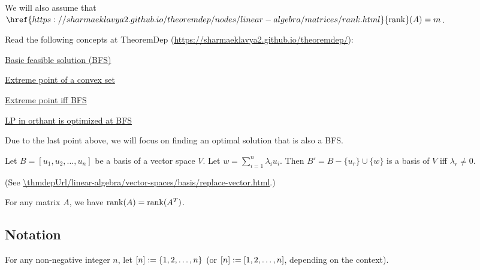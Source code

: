 We will also assume \wLoG{} that
$\href{https://sharmaeklavya2.github.io/theoremdep/nodes/linear-algebra/matrices/rank.html}{\rank}(A) = m$.

\begin{inLongVersion}
Read the following concepts at TheoremDep (\url{https://sharmaeklavya2.github.io/theoremdep/}):
\begin{tightemize}
\item \href{\thmdepUrl/convexity/polyhedra/bfs.html}{Basic feasible solution (BFS)}
\item \href{\thmdepUrl/convexity/extreme-point.html}{Extreme point of a convex set}
\item \href{\thmdepUrl/convexity/polyhedra/extreme-point-iff-bfs.html}{Extreme point iff BFS}
\item \href{\thmdepUrl/convexity/polyhedra/orth-lp.html}{LP in orthant is optimized at BFS}
\end{tightemize}
Due to the last point above, we will focus on finding an optimal solution that is also a BFS.
\end{inLongVersion}

\begin{lemma}
\label{thm:replace-vector-in-basis}
Let $B = [u_1, u_2, \ldots, u_n]$ be a basis of a vector space $V$.
Let $w = \sum_{i=1}^n \lambda_i u_i$.
Then $B' = B - \{u_r\} \cup \{w\}$ is a basis of $V$ iff $\lambda_r \neq 0$.
\end{lemma}
\begin{longProof}
(See \url{\thmdepUrl/linear-algebra/vector-spaces/basis/replace-vector.html}.)
\end{longProof}

\begin{inLongVersion}
\begin{lemma}
For any matrix $A$, we have $\operatorname{rank}(A) = \operatorname{rank}(A^T)$.
\end{lemma}
\end{inLongVersion}

\subsection{Notation}

For any non-negative integer $n$, let $[n] := \{1, 2, \ldots, n\}$
(or $[n] := [1, 2, \ldots, n]$, depending on the context).

